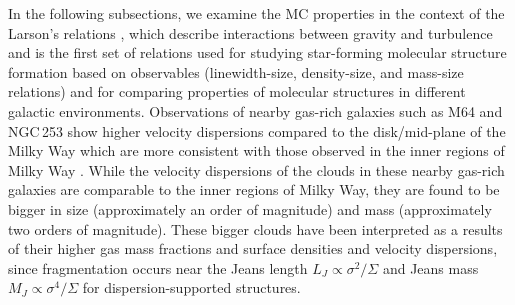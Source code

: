 \documentclass[iop]{emulateapj} %
\begin{document}
In the following subsections,
we examine the MC properties in the context of the Larson's relations \citep{Larson81a}, which
describe interactions between gravity and turbulence and is the first set of 
relations used for studying star-forming molecular structure formation based on observables (linewidth-size,
density-size, and mass-size relations) and for comparing properties of molecular structures
in different galactic environments.
Observations of nearby gas-rich galaxies such as M64 and NGC\,253
show higher velocity dispersions compared
to the disk/mid-plane of the Milky Way which
are more consistent with those observed in the inner regions of
Milky Way \citep{Oka01a, Rosolowsky05a, Heyer09a, Leroy15a}.  %
While the velocity dispersions of the clouds in these nearby gas-rich galaxies are comparable
to the inner regions of Milky Way, they are found to be bigger in size (approximately
an order of magnitude) and mass (approximately two orders of magnitude).
These bigger clouds have been interpreted as a results of their higher gas mass fractions and
surface densities and velocity dispersions, since
fragmentation occurs near the Jeans length $L_J\propto\sigma^2/\Sigma$
and Jeans mass $M_J\propto\sigma^4/\Sigma$
for dispersion-supported structures.
\end{document}
